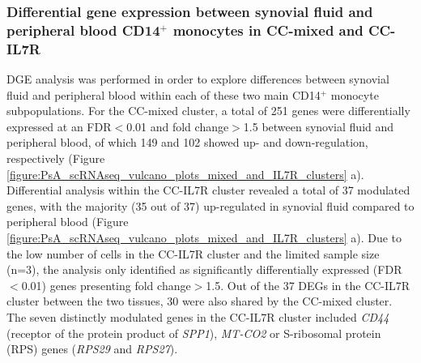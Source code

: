 \subsubsection{Differential gene expression between synovial fluid and peripheral blood CD14$^+$ monocytes in CC-mixed and CC-IL7R}
DGE analysis was performed in order to explore differences between synovial fluid and peripheral blood within each of these two main CD14$^+$ monocyte subpopulations. For the CC-mixed cluster, a total of 251 genes were differentially expressed at an FDR$<$0.01 and fold change$>$1.5 between synovial fluid and peripheral blood, of which 149 and 102 showed up- and down-regulation, respectively (Figure \ref{figure:PsA_scRNAseq_vulcano_plots_mixed_and_IL7R_clusters} a). Differential analysis within the CC-IL7R cluster revealed a total of 37 modulated genes, with the majority (35 out of 37) up-regulated in synovial fluid compared to peripheral blood (Figure \ref{figure:PsA_scRNAseq_vulcano_plots_mixed_and_IL7R_clusters} a). Due to the low number of cells in the CC-IL7R cluster and the limited sample size (n=3), the analysis only identified as significantly differentially expressed (FDR$<$0.01) genes presenting fold change$>$1.5. Out of the 37 DEGs in the CC-IL7R cluster between the two tissues, 30 were also shared by the CC-mixed cluster. The seven distinctly modulated genes in the CC-IL7R cluster included \textit{CD44} (receptor of the protein product of \textit{SPP1}), \textit{MT-CO2} or S-ribosomal protein (RPS) genes (\textit{RPS29} and \textit{RPS27}). 



